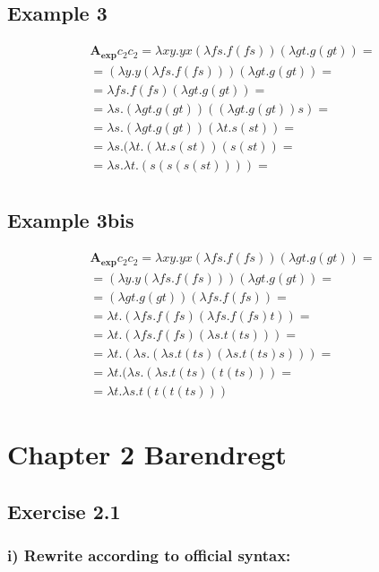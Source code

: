 \documentclass[11pt]{article}
\begin{document}
\subsection*{Example 3}
\begin{gather*}
\mathbf{A_{exp}} c_{2}c_{2} = \lambda xy.yx (\lambda fs.f(fs)) (\lambda gt.g(gt)) = \\
= (\lambda y.y (\lambda fs.f(fs))) (\lambda gt.g(gt)) = \\
= \lambda fs.f(fs) (\lambda gt.g(gt)) = \\
= \lambda s. (\lambda gt.g(gt)) ((\lambda gt.g(gt))s) = \\
= \lambda s. (\lambda gt.g(gt)) (\lambda t.s(st)) = \\
= \lambda s. (\lambda t. (\lambda t.s(st)) (s(st)) = \\
= \lambda s. \lambda t. (s(s (s(st)))) = \\
\end{gather*}

\subsection*{Example 3bis}
\begin{gather*}
\mathbf{A_{exp}} c_{2}c_{2} = \lambda xy.yx (\lambda fs.f(fs)) (\lambda gt.g(gt)) = \\
= (\lambda y.y (\lambda fs.f(fs))) (\lambda gt.g(gt)) = \\
= (\lambda gt.g(gt)) (\lambda fs.f(fs)) = \\
= \lambda t. (\lambda fs.f(fs) (\lambda fs.f(fs)t)) = \\
= \lambda t. (\lambda fs.f(fs) (\lambda s.t(ts))) = \\
= \lambda t. (\lambda s. (\lambda s.t(ts) (\lambda s.t(ts)s))) = \\
= \lambda t. (\lambda s. (\lambda s.t(ts) (t(ts))) = \\
= \lambda t. \lambda s.t(t(t(ts)))
\end{gather*}


\section*{Chapter 2 Barendregt}
\subsection*{Exercise 2.1}
\subsubsection*{i) Rewrite according to official syntax:}
\end{document}
